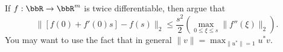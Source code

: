 \documentclass[12pt, leqno]{article}
\begin{document}

If $f : \bbR \rightarrow \bbR^m$ is twice differentiable, then argue
that
\[
  \|[f(0) + f'(0) s] - f(s) \|_2 \leq \frac{s^2}{2} \left( \max_{0 \leq
    \xi \leq s} \|f''(\xi)\|_2 \right).
\]
You may want to use the fact that in general
$\|v\| = \max_{\|u^*\| = 1} u^*v$.
\end{document}

